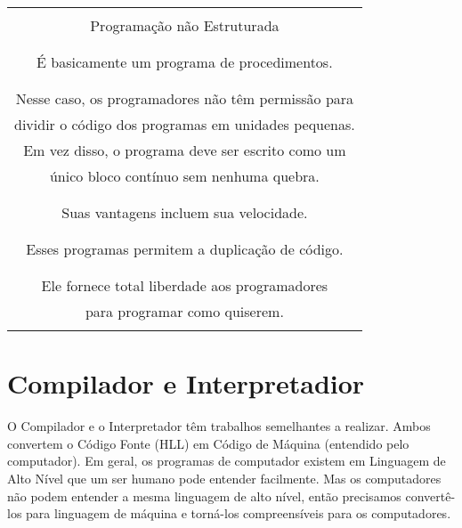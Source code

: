 \documentclass[12pt,a4paper]{abntex2}
\begin{document}
\begin{table}%
    \begin{tabular}{|c|} \hline \\
    Programação não Estruturada \\\\ \hline \\
    É basicamente um programa de procedimentos. \\ \\\hdashline \\
    Nesse caso, os programadores não têm permissão para\\
    dividir o código dos programas em unidades pequenas.\\
    Em vez disso, o programa deve ser escrito como um\\
    único bloco contínuo sem nenhuma quebra. \\ \\\hdashline \\
    Suas vantagens incluem sua velocidade. \\ \\\hdashline \\
    Esses programas permitem a duplicação de código.  \\ \\\hdashline \\
    Ele fornece total liberdade aos programadores \\
    para programar como quiserem. \\ \\\hline

    \end{tabular}
\end{table}

\vspace{5cm}


\section{Compilador e Interpretadior}
O Compilador e o Interpretador têm trabalhos semelhantes a realizar.
Ambos convertem o Código Fonte (HLL) em Código de Máquina (entendido pelo computador).
Em geral, os programas de computador existem em Linguagem de Alto Nível que um ser humano
pode entender facilmente. Mas os computadores não podem entender a mesma linguagem de
alto nível, então precisamos convertê-los para linguagem de máquina e torná-los compreensíveis
para os computadores.
\end{document}
